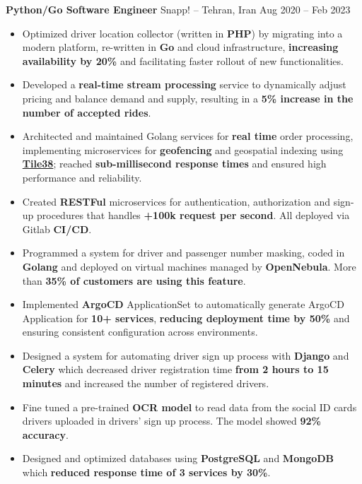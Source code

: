 \textbf{Python/Go Software Engineer} Snapp! -- Tehran, Iran \hfill Aug 2020 -- Feb 2023
\vspace{-10pt}
\begin{itemize}
      \item Optimized driver location collector (written in \textbf{PHP}) by migrating into a modern platform, re-written in \textbf{Go} and cloud infrastructure,
            \textbf{increasing availability by 20\%} and facilitating faster rollout of new functionalities.
      \item Developed a \textbf{real-time stream processing} service to dynamically adjust pricing and balance demand and supply,
            resulting in a \textbf{5\% increase in the number of accepted rides}.
      \item Architected and maintained Golang services for \textbf{real time} order processing, implementing microservices for \textbf{geofencing} and
            geospatial indexing using \href{https://tile38.com}{\textbf{Tile38}}; reached \textbf{sub-millisecond response times} and
            ensured high performance and reliability.
      \item Created \textbf{RESTFul} microservices for authentication, authorization and sign-up procedures that handles \textbf{+100k request per second}. All  deployed via Gitlab \textbf{CI/CD}.
      \item Programmed a system for driver and passenger number masking, coded in \textbf{Golang}
            and deployed on virtual machines managed by \textbf{OpenNebula}. More than \textbf{35\% of customers are using this feature}.
      \item Implemented \textbf{ArgoCD} ApplicationSet to automatically generate ArgoCD Application for \textbf{10+ services}, \textbf{reducing deployment time by 50\%} and ensuring consistent configuration across environments.
      \item Designed a system for automating driver sign up process with \textbf{Django} and \textbf{Celery} which decreased driver registration time \textbf{from 2 hours to 15 minutes} and increased the number of registered drivers.
      \item Fine tuned a pre-trained \textbf{OCR model} to read data from the social ID cards drivers uploaded in drivers' sign up process. The model showed \textbf{92\% accuracy}.
      \item Designed and optimized databases using \textbf{PostgreSQL} and \textbf{MongoDB} which \textbf{reduced response time of 3 services by 30\%}.
\end{itemize}

